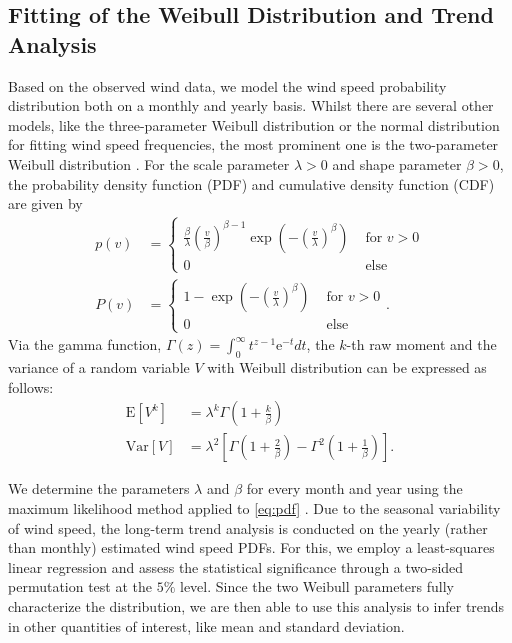 \documentclass{article}
\theoremstyle{plain}
\theoremstyle{definition}
\theoremstyle{remark}
\begin{document}
\subsection{Fitting of the Weibull Distribution and Trend Analysis}\label{sec:weibull}
Based on the observed wind data, we model the wind speed probability distribution both on a monthly and yearly basis.
Whilst there are several other models, like the three-parameter Weibull distribution or the normal distribution for fitting wind speed frequencies, the most prominent one is the two-parameter Weibull distribution
\cite{review, statanalysis, mohammadi2016assessing}.
For the scale parameter $\lambda >0$ and shape parameter $\beta >0$, the probability density function (PDF) and cumulative density function (CDF) are given by
\begin{align}
    \label{eq:pdf}
    p(v) &=
    \begin{cases}
        \frac{\beta}{\lambda} \left( \frac{v}{\beta}\right)^{\beta-1} 
        \exp{ \left( -\left(\frac{v}{\lambda}\right)^\beta \right)} & \text{  for } v>0 \\
        0 & \text{ else}
    \end{cases} \\
    \label{eq:cdf}
    P(v)&=
    \begin{cases}
        1- \exp{\left(-\left(\frac{v}{\lambda}\right)^\beta \right)} & \text{  for } v>0 \\
        0 & \text{ else}
    \end{cases}.
\end{align}
Via the gamma function, $\Gamma(z)= \int_{0}^{\infty}t^{z-1} \mathrm{e}^{-t}dt$, 
the $k$-th raw moment and the variance of a random variable $V$ with Weibull distribution can be expressed as follows: 
\begin{align}  
    \mathrm{E}[V^k] &= \lambda^k \Gamma \left( 1 + \frac{k}{\beta} \right) \label{eq:n-raw-moment} \\
    \mathrm{Var}[V] &= \lambda^2 \left[  \Gamma \left( 1 + \frac{2}{\beta}\right) \label{eq:var}
    - \Gamma^2 \left( 1 + \frac{1}{\beta}\right)\right].
\end{align}

We determine the parameters $\lambda$ and $\beta$ for every month and year using 
the maximum likelihood method applied to \eqref{eq:pdf} \cite{mohammadi2016assessing}.
Due to the seasonal variability of wind speed, the long-term trend analysis is conducted on the yearly 
(rather than monthly) estimated wind speed PDFs. For this, we employ a least-squares linear regression and assess the statistical significance through a two-sided permutation test at the $5\%$ level. 
Since the two Weibull parameters fully characterize the distribution, we are then able to use this analysis to infer trends in other quantities of interest, like mean and standard deviation.
\end{document}
